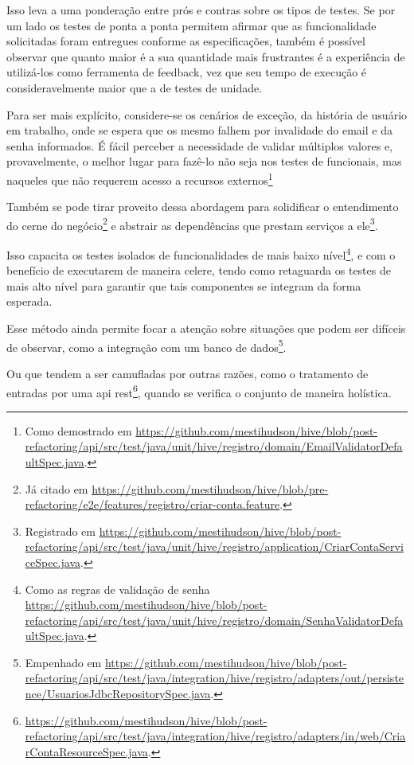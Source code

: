   Isso leva a uma ponderação entre prós e contras sobre os tipos de testes. Se por um lado os testes de ponta a ponta permitem afirmar que as funcionalidade solicitadas foram entregues conforme as especificações, também é possível observar que quanto maior é a sua quantidade mais frustrantes é a experiência de utilizá-los como ferramenta de feedback, vez que seu tempo de execução é consideravelmente maior que a de testes de unidade.

  Para ser mais explícito, considere-se os cenários de exceção, da história de usuário em trabalho, onde se espera que os mesmo falhem por invalidade do email e da senha informados. É fácil perceber a necessidade de validar múltiplos valores e, provavelmente, o melhor lugar para fazê-lo não seja nos testes de funcionais, mas naqueles que não requerem acesso a recursos externos\footnote{Como demostrado em \url{https://github.com/mestihudson/hive/blob/post-refactoring/api/src/test/java/unit/hive/registro/domain/EmailValidatorDefaultSpec.java}.}

  Também se pode tirar proveito dessa abordagem para solidificar o entendimento do cerne do negócio\footnote{Já citado em \url{https://github.com/mestihudson/hive/blob/pre-refactoring/e2e/features/registro/criar-conta.feature}.} e abstrair as dependências que prestam serviços a ele\footnote{Registrado em \url{https://github.com/mestihudson/hive/blob/post-refactoring/api/src/test/java/unit/hive/registro/application/CriarContaServiceSpec.java}.}.

  Isso capacita os testes isolados de funcionalidades de mais baixo nível\footnote{Como as regras de validação de senha \url{https://github.com/mestihudson/hive/blob/post-refactoring/api/src/test/java/unit/hive/registro/domain/SenhaValidatorDefaultSpec.java}.}, e com o benefício de executarem de maneira celere, tendo como retaguarda os testes de mais alto nível para garantir que tais componentes se integram da forma esperada.

  Esse método ainda permite focar a atenção sobre situações que podem ser difíceis de observar, como a integração com um banco de dados\footnote{Empenhado em \url{https://github.com/mestihudson/hive/blob/post-refactoring/api/src/test/java/integration/hive/registro/adapters/out/persistence/UsuariosJdbcRepositorySpec.java}.}.

  Ou que tendem a ser camufladas por outras razões, como o tratamento de entradas por uma api rest\footnote{\url{https://github.com/mestihudson/hive/blob/post-refactoring/api/src/test/java/integration/hive/registro/adapters/in/web/CriarContaResourceSpec.java}.}, quando se verifica o conjunto de maneira holística.

